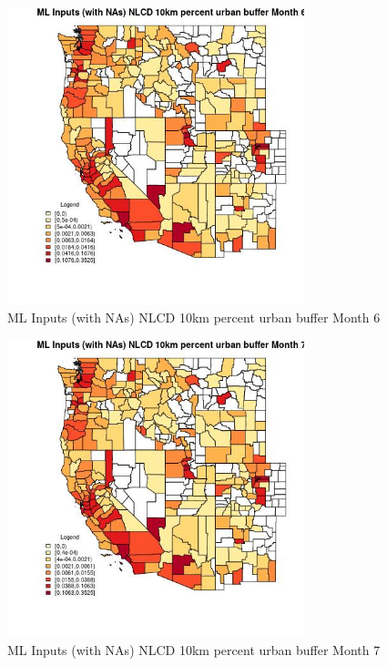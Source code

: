 \begin{figure} 
\centering  
\includegraphics[width=0.77\textwidth]{Code_Outputs/Report_ML_input_PM25_Step4_part_f_de_duplicated_aveswNAs_CountyNLCD_10km_percent_urban_buffermedianMonth6.jpg} 
\caption{\label{fig:Report_ML_input_PM25_Step4_part_f_de_duplicated_aveswNAsCountyNLCD_10km_percent_urban_buffermedianMonth6}ML Inputs (with NAs) NLCD 10km percent urban buffer Month 6} 
\end{figure} 
 

\clearpage 

\begin{figure} 
\centering  
\includegraphics[width=0.77\textwidth]{Code_Outputs/Report_ML_input_PM25_Step4_part_f_de_duplicated_aveswNAs_CountyNLCD_10km_percent_urban_buffermedianMonth7.jpg} 
\caption{\label{fig:Report_ML_input_PM25_Step4_part_f_de_duplicated_aveswNAsCountyNLCD_10km_percent_urban_buffermedianMonth7}ML Inputs (with NAs) NLCD 10km percent urban buffer Month 7} 
\end{figure} 
 

